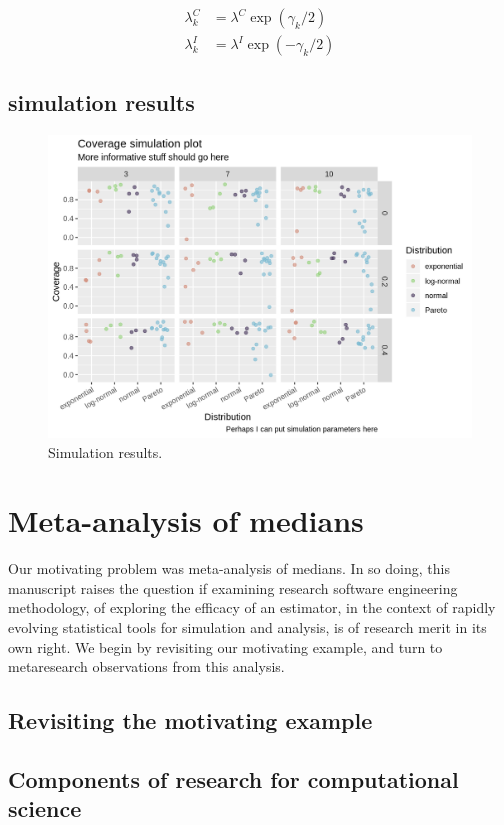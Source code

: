 \documentclass{article}
\begin{document}
\begin{alignat*}
 \lambda_k^C & = \lambda^C  \exp(\gamma_k/2)\\
 \lambda_k^I & = \lambda^I  \exp(-\gamma_k/2)
\end{alignat*}



\subsection{simulation results}

\begin{figure}
   \includegraphics[width=\textwidth]{placeholder-coverage-plot.png}
   \caption{Simulation results.}
   \label{fig:sims}
\end{figure}


\section{Meta-analysis of medians}

Our motivating problem was meta-analysis of medians. In so doing, this manuscript raises the question if examining research software engineering methodology, of exploring the efficacy of an estimator, in the context of rapidly evolving statistical tools for simulation and analysis, is of research merit in its own right. We begin by revisiting our motivating example, and turn to metaresearch observations from this analysis.


\subsection{Revisiting the motivating example}



\subsection{Components of research for computational science}


\end{document}
